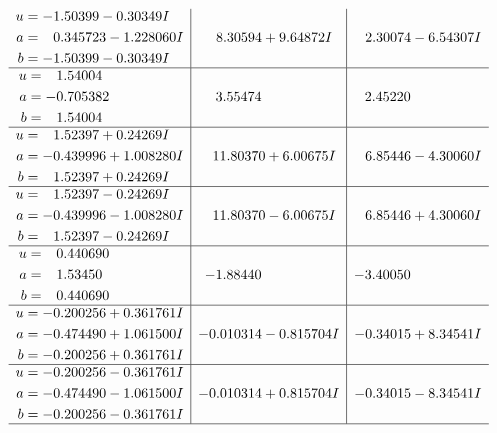 \documentclass[1p]{elsarticle_modified}
\theoremstyle{definition}
\begin{document}
$$\begin{array}{c|c|c}
\begin{aligned}
u &= -1.50399 - 0.30349 I \\
a &= \phantom{-}0.345723 - 1.228060 I \\
b &= -1.50399 - 0.30349 I\end{aligned}
 & \phantom{-}8.30594 + 9.64872 I & \phantom{-}2.30074 - 6.54307 I \\ \hline\begin{aligned}
u &= \phantom{-}1.54004\phantom{ +0.000000I} \\
a &= -0.705382\phantom{ +0.000000I} \\
b &= \phantom{-}1.54004\phantom{ +0.000000I}\end{aligned}
 & \phantom{-}3.55474\phantom{ +0.000000I} & \phantom{-}2.45220\phantom{ +0.000000I} \\ \hline\begin{aligned}
u &= \phantom{-}1.52397 + 0.24269 I \\
a &= -0.439996 + 1.008280 I \\
b &= \phantom{-}1.52397 + 0.24269 I\end{aligned}
 & \phantom{-}11.80370 + 6.00675 I & \phantom{-}6.85446 - 4.30060 I \\ \hline\begin{aligned}
u &= \phantom{-}1.52397 - 0.24269 I \\
a &= -0.439996 - 1.008280 I \\
b &= \phantom{-}1.52397 - 0.24269 I\end{aligned}
 & \phantom{-}11.80370 - 6.00675 I & \phantom{-}6.85446 + 4.30060 I \\ \hline\begin{aligned}
u &= \phantom{-}0.440690\phantom{ +0.000000I} \\
a &= \phantom{-}1.53450\phantom{ +0.000000I} \\
b &= \phantom{-}0.440690\phantom{ +0.000000I}\end{aligned}
 & -1.88440\phantom{ +0.000000I} & -3.40050\phantom{ +0.000000I} \\ \hline\begin{aligned}
u &= -0.200256 + 0.361761 I \\
a &= -0.474490 + 1.061500 I \\
b &= -0.200256 + 0.361761 I\end{aligned}
 & -0.010314 - 0.815704 I & -0.34015 + 8.34541 I \\ \hline\begin{aligned}
u &= -0.200256 - 0.361761 I \\
a &= -0.474490 - 1.061500 I \\
b &= -0.200256 - 0.361761 I\end{aligned}
 & -0.010314 + 0.815704 I & -0.34015 - 8.34541 I\\
 \hline 
 \end{array}$$\newpage\newpage\renewcommand{\arraystretch}{1}
\end{document}
